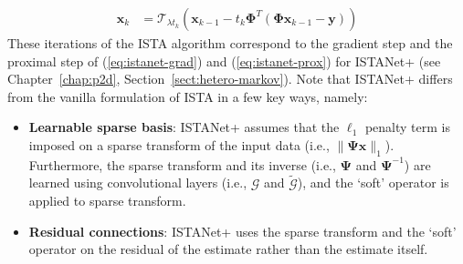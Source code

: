 \begin{align}
    \mathbf{x}_k &= \mathcal{T}_{\lambda t_k}(\mathbf{x}_{k-1} - t_k\mathbf{\Phi}^T(\mathbf{\Phi} \mathbf{x}_{k-1} - \mathbf{y}))
\end{align}
These iterations of the ISTA algorithm correspond to the gradient step and the proximal step of (\ref{eq:istanet-grad}) and (\ref{eq:istanet-prox}) for ISTANet+ (see Chapter~\ref{chap:p2d}, Section~\ref{sect:hetero-markov}). Note that ISTANet+ differs from the vanilla formulation of ISTA in a few key ways, namely:
\begin{itemize}
    \item \textbf{Learnable sparse basis}: ISTANet+ assumes that the $\ell_1$ penalty term is imposed on a sparse transform of the input data (i.e., $\|\mathbf{\Psi}\mathbf{x}\|_1$). Furthermore, the sparse transform and its inverse (i.e., $\mathbf{\Psi}$ and $\mathbf{\Psi}^{-1}$) are learned using convolutional layers (i.e., $\mathcal{G}$ and $\tilde{\mathcal{G}}$), and the `soft' operator is applied to sparse transform.
    \item \textbf{Residual connections}: ISTANet+ uses the sparse transform and the `soft' operator on the residual of the estimate rather than the estimate itself.
\end{itemize}